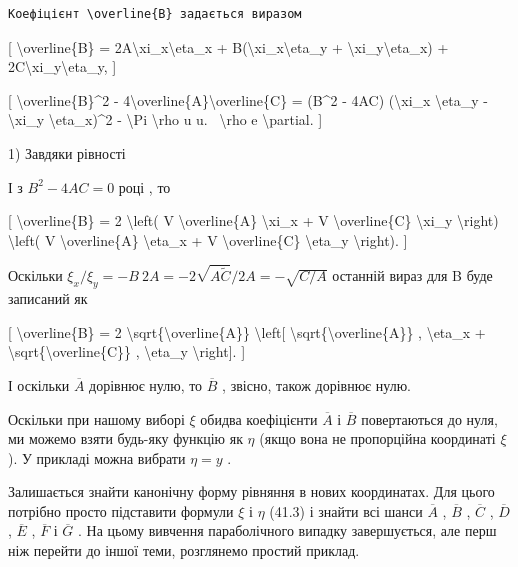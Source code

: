 \documentclass[
]{article}
\begin{document}
{{{\begin{verbatim}
Коефіцієнт \overline{B} задається виразом
\end{verbatim}

{[} \textbackslash overline\{B\} =
2A\textbackslash xi\_x\textbackslash eta\_x +
B(\textbackslash xi\_x\textbackslash eta\_y +
\textbackslash xi\_y\textbackslash eta\_x) +
2C\textbackslash xi\_y\textbackslash eta\_y, {]}

{[} \textbackslash overline\{B\}\^{}2 -
4\textbackslash overline\{A\}\textbackslash overline\{C\} = (B\^{}2 -
4AC) (\textbackslash xi\_x \textbackslash eta\_y - \textbackslash xi\_y
\textbackslash eta\_x)\^{}2 - \textbackslash Pi \textbackslash rho u u.
~\textbackslash rho e \textbackslash partial. {]}

1) Завдяки рівності

І з \(B^2 - 4AC = 0\) році , то

{[} \textbackslash overline\{B\} = 2 \textbackslash left( V
\textbackslash overline\{A\} \textbackslash xi\_x + V
\textbackslash overline\{C\} \textbackslash xi\_y \textbackslash right)
\textbackslash left( V \textbackslash overline\{A\}
\textbackslash eta\_x + V \textbackslash overline\{C\}
\textbackslash eta\_y \textbackslash right). {]}

Оскільки
\(\xi_x/\xi_y = -B \ 2A = -2 \sqrt{A\tilde{C}}/2A = -\sqrt{C/A}\)
останній вираз для B буде записаний як

{[} \textbackslash overline\{B\} = 2
\textbackslash sqrt\{\textbackslash overline\{A\}\}
\textbackslash left{[}
\textbackslash sqrt\{\textbackslash overline\{A\}\} ,
\textbackslash eta\_x +
\textbackslash sqrt\{\textbackslash overline\{C\}\} ,
\textbackslash eta\_y \textbackslash right{]}. {]}

І оскільки \(\overline{A}\) дорівнює нулю, то \(\overline{B}\) , звісно,
також дорівнює нулю.

Оскільки при нашому виборі \(\xi\) обидва коефіцієнти \(\overline{A}\) і
\(\overline{B}\) повертаються до нуля, ми можемо взяти будь-яку функцію
як \(\eta\) (якщо вона не пропорційна координаті \(\xi\) ). У прикладі
можна вибрати \(\eta = y\) .

Залишається знайти канонічну форму рівняння в нових координатах. Для
цього потрібно просто підставити формули \(\xi\) і \(\eta\) (41.3) і
знайти всі шанси \(\overline{A}\) , \(\overline{B}\) , \(\overline{C}\)
, \(\overline{D}\) , \(\overline{E}\) , \(\overline{F}\) і
\(\overline{G}\) . На цьому вивчення параболічного випадку завершується,
але перш ніж перейти до іншої теми, розглянемо простий приклад.

}}}
\end{document}
